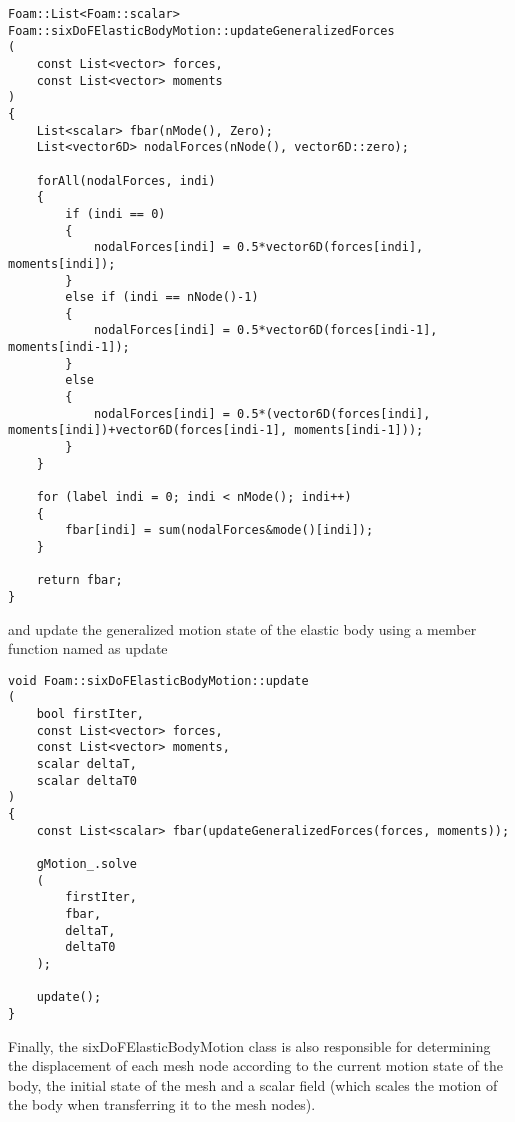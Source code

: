 \begin{lstlisting}
Foam::List<Foam::scalar> Foam::sixDoFElasticBodyMotion::updateGeneralizedForces
(
    const List<vector> forces,
    const List<vector> moments
)
{
    List<scalar> fbar(nMode(), Zero);
    List<vector6D> nodalForces(nNode(), vector6D::zero);

    forAll(nodalForces, indi)
    {
        if (indi == 0)
        {                       
            nodalForces[indi] = 0.5*vector6D(forces[indi], moments[indi]);
        }
        else if (indi == nNode()-1)
        {
            nodalForces[indi] = 0.5*vector6D(forces[indi-1], moments[indi-1]);
        }
        else
        {
            nodalForces[indi] = 0.5*(vector6D(forces[indi], moments[indi])+vector6D(forces[indi-1], moments[indi-1]));
        }
    }

    for (label indi = 0; indi < nMode(); indi++)
    {
        fbar[indi] = sum(nodalForces&mode()[indi]);
    }

    return fbar;
}
\end{lstlisting}

\noindent and update the generalized motion state of the elastic body using a member function named as update

\begin{lstlisting}
void Foam::sixDoFElasticBodyMotion::update
(
    bool firstIter,
    const List<vector> forces,
    const List<vector> moments,
    scalar deltaT,
    scalar deltaT0
)
{
    const List<scalar> fbar(updateGeneralizedForces(forces, moments));

    gMotion_.solve
    (
        firstIter,
        fbar,
        deltaT,
        deltaT0
    );

    update();
}
\end{lstlisting}

Finally, the sixDoFElasticBodyMotion class is also responsible for determining the displacement of each mesh node according to the current motion state of the body, the initial state of the mesh and a scalar field (which scales the motion of the body when transferring it to the mesh nodes).

